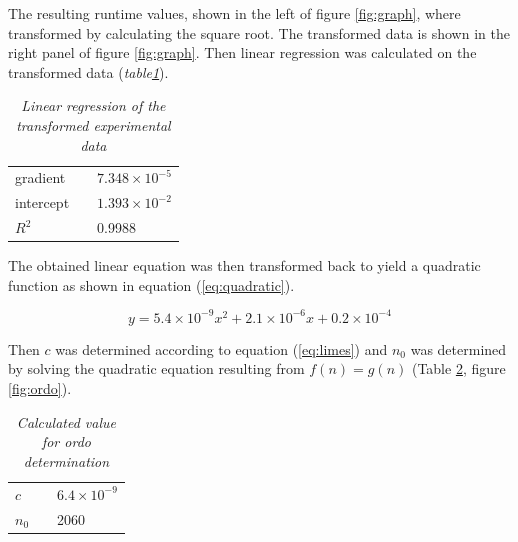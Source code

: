 \documentclass[a4paper,11pt,twoside]{article}
\begin{document}
The resulting runtime values, shown in the left of figure
\ref{fig:graph}, where transformed by calculating the square
root. The transformed data is shown in the right panel of figure 
\ref{fig:graph}. Then linear regression was calculated on the
transformed data (\textit{table\ref{tab:regression}}).

\begin{table}[]
\caption{\textit{Linear regression of the transformed experimental data}}
\label{tab:regression}
\begin{tabular}{lll}

gradient &  & $7.348 \times 10^{-5}$ \\
intercept &  & $1.393 \times 10^{-2}$ \\
$R^2$ &  & 0.9988 \\ 
\end{tabular}
\end{table}

The obtained linear equation was then transformed back to yield a
quadratic function as shown in equation (\ref{eq:quadratic}).

\begin{equation} \label{eq:quadratic}
y = 5.4 \times 10^{-9}x^2 + 2.1 \times 10^{-6}x + 0.2 \times 10^{-4}
\end{equation}

Then $c$ was determined according to equation (\ref{eq:limes}) and
$n_0$ was determined by solving the quadratic equation resulting from
$f(n) = g(n)$ (Table \ref{tab:ordo}, figure \ref{fig:ordo}). 



\begin{table}[]
\caption{\textit{Calculated value for ordo determination}}
\label{tab:ordo}
\begin{tabular}{lll}
$c$                       &  & $6.4 \times 10^{-9}$ \\
\multicolumn{1}{c}{$n_0$} &  & 2060                
\end{tabular}
\end{table}
\end{document}
